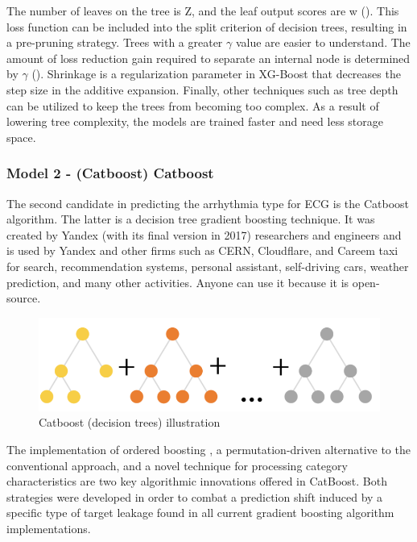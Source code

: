 \noindent

The number of leaves on the tree is Z, and the leaf output scores are w (\cite{xgb2}). This loss function can be included into the split criterion of decision trees, resulting in a pre-pruning strategy. Trees with a greater $\gamma$ value are easier to understand. The amount of loss reduction gain required to separate an internal node is determined by $\gamma$ (\cite{xgb1}). Shrinkage is a regularization parameter in XG-Boost that decreases the step size in the additive expansion. Finally, other techniques such as tree depth can be utilized to keep the trees from becoming too complex. As a result of lowering tree complexity, the models are trained faster and need less storage space.

\subsubsection{Model 2 - (Catboost) Catboost} \label{3model2}

The second candidate in predicting the arrhythmia type for ECG is the Catboost algorithm. The latter is a decision tree gradient boosting technique. It was created by Yandex (with its final version in 2017) researchers and engineers and is used by Yandex and other firms such as CERN, Cloudflare, and Careem taxi for search, recommendation systems, personal assistant, self-driving cars, weather prediction, and many other activities. Anyone can use it because it is open-source.

\begin{figure}[H]
\centering
\includegraphics[scale=0.6]{img/catboost.PNG}
\caption{Catboost (decision trees) illustration}
\label{fig:catboost}
\end{figure}

The implementation of ordered boosting \cite{catboost}, a permutation-driven alternative to the conventional approach, and a novel technique for processing category characteristics are two key algorithmic innovations offered in CatBoost. Both strategies were developed in order to combat a prediction shift induced by a specific type of target leakage found in all current gradient boosting algorithm implementations.

